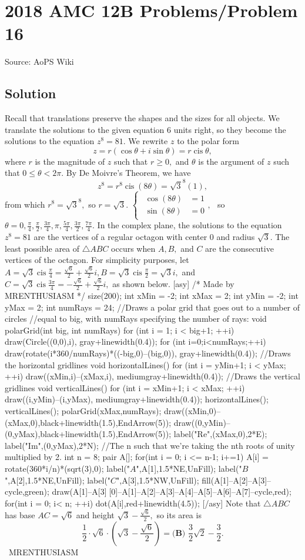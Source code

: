\documentclass[12pt]{article}
\begin{document}
\section*{{2018 AMC 12B Problems/Problem 16}}
Source: AoPS Wiki

\subsection*{Solution}
Recall that translations preserve the shapes and the sizes for all objects. We translate the solutions to the given equation $6$ units right, so they become the solutions to the equation $z^8=81.$ We rewrite $z$ to the polar form \[z=r(\cos\theta+i\sin\theta)=r\operatorname{cis}\theta,\] where $r$ is the magnitude of $z$ such that $r\geq0,$ and $\theta$ is the argument of $z$ such that $0\leq\theta<2\pi.$ By De Moivre's Theorem, we have \[z^8=r^8\operatorname{cis}(8\theta)={\sqrt3}^8(1),\] from which $r^8={\sqrt3}^8,$ so $r=\sqrt3.$ $\begin{cases} \begin{aligned} \cos(8\theta) &= 1 \\ \sin(8\theta) &= 0 \end{aligned}, \end{cases}$ so $\theta=0,\frac{\pi}{4},\frac{\pi}{2},\frac{3\pi}{4},\pi,\frac{5\pi}{4},\frac{3\pi}{2},\frac{7\pi}{4}.$ In the complex plane, the solutions to the equation $z^8=81$ are the vertices of a regular octagon with center $0$ and radius $\sqrt3.$ The least possible area of $\triangle ABC$ occurs when $A,B,$ and $C$ are the consecutive vertices of the octagon. For simplicity purposes, let $A=\sqrt3\operatorname{cis}\frac{\pi}{4}=\frac{\sqrt6}{2}+\frac{\sqrt6}{2}i, B=\sqrt3\operatorname{cis}\frac{\pi}{2}=\sqrt3i,$ and $C=\sqrt3\operatorname{cis}\frac{3\pi}{4}=-\frac{\sqrt6}{2}+\frac{\sqrt6}{2}i,$ as shown below. [asy] /* Made by MRENTHUSIASM */ size(200); int xMin = -2; int xMax = 2; int yMin = -2; int yMax = 2; int numRays = 24; //Draws a polar grid that goes out to a number of circles //equal to big, with numRays specifying the number of rays: void polarGrid(int big, int numRays) { for (int i = 1; i < big+1; ++i) { draw(Circle((0,0),i), gray+linewidth(0.4)); } for (int i=0;i<numRays;++i) draw(rotate(i*360/numRays)*((-big,0)--(big,0)), gray+linewidth(0.4)); } //Draws the horizontal gridlines void horizontalLines() { for (int i = yMin+1; i < yMax; ++i) { draw((xMin,i)--(xMax,i), mediumgray+linewidth(0.4)); } } //Draws the vertical gridlines void verticalLines() { for (int i = xMin+1; i < xMax; ++i) { draw((i,yMin)--(i,yMax), mediumgray+linewidth(0.4)); } } horizontalLines(); verticalLines(); polarGrid(xMax,numRays); draw((xMin,0)--(xMax,0),black+linewidth(1.5),EndArrow(5)); draw((0,yMin)--(0,yMax),black+linewidth(1.5),EndArrow(5)); label("Re",(xMax,0),2*E); label("Im",(0,yMax),2*N); //The n such that we're taking the nth roots of unity multiplied by 2. int n = 8; pair A[]; for(int i = 0; i <= n-1; i+=1) { A[i] = rotate(360*i/n)*(sqrt(3),0); } label("$A$",A[1],1.5*NE,UnFill); label("$B$",A[2],1.5*NE,UnFill); label("$C$",A[3],1.5*NW,UnFill); fill(A[1]--A[2]--A[3]--cycle,green); draw(A[1]--A[3]^^A[0]--A[1]--A[2]--A[3]--A[4]--A[5]--A[6]--A[7]--cycle,red); for(int i = 0; i< n; ++i) dot(A[i],red+linewidth(4.5)); [/asy] Note that $\triangle ABC$ has base $AC=\sqrt6$ and height $\sqrt3-\frac{\sqrt6}{2},$ so its area is \[\frac12\cdot\sqrt6\cdot\left(\sqrt3-\frac{\sqrt6}{2}\right)=\boxed{\textbf{(B) } \frac{3}{2}\sqrt{2}-\frac{3}{2}}.\] ~MRENTHUSIASM
\end{document}

